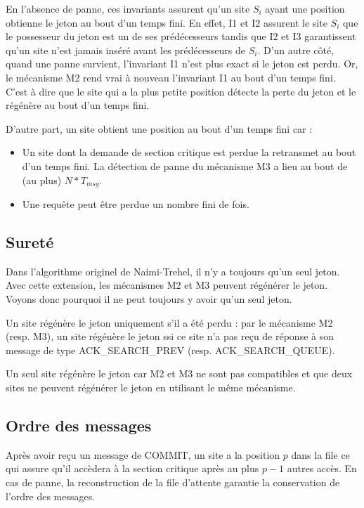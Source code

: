 En l'absence de panne, ces invariants assurent qu'un site $S_i$ ayant une position obtienne le jeton au bout d'un temps fini. En effet, I1 et I2 assurent le site $S_i$ que le possesseur du jeton est un de ses prédécesseurs tandis que I2 et I3 garantissent qu'un site n'est jamais inséré avant les prédécesseurs de $S_i$. D'un autre côté, quand une panne survient, l'invariant I1 n'est plus exact si le jeton est perdu. Or, le mécanisme M2 rend vrai à nouveau l'invariant I1 au bout d'un temps fini. C'est à dire que le site qui a la plus petite position détecte la perte du jeton et le régénère au bout d'un temps fini.

D'autre part, un site obtient une position au bout d'un temps fini car :

\begin{itemize}
\item Un site dont la demande de section critique est perdue la retransmet au bout d'un temps fini. La détection de panne du mécanisme M3 a lieu au bout de (au plus) $N*T_{msg}$.
\item Une requête peut être perdue un nombre fini de fois.
\end{itemize}


\subsection{Sureté}
Dans l'algorithme originel de Naimi-Trehel, il n'y a toujours qu'un seul jeton. Avec cette extension, les mécanismes M2 et M3 peuvent régénérer le jeton. Voyons donc pourquoi il ne peut toujours y avoir qu'un seul jeton.

Un site régénère le jeton uniquement s'il a été perdu : par le mécanisme M2 (resp. M3), un site régénère le jeton ssi ce site n'a pas reçu de réponse à son message de type ACK\_SEARCH\_PREV (resp. ACK\_SEARCH\_QUEUE).

Un seul site régénère le jeton car M2 et M3 ne sont pas compatibles et que deux sites ne peuvent régénérer le jeton en utilisant le même mécanisme.

\subsection{Ordre des messages}
Après avoir reçu un message de COMMIT, un site a la position $p$ dans la file ce qui assure qu'il accèdera à la section critique après au plus $p-1$ autres accès. En cas de panne, la reconstruction de la file d'attente garantie la conservation de l'ordre des messages.


